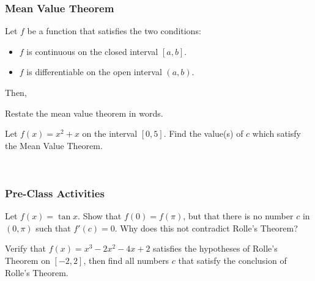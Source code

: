 \documentclass[notes]{subfiles}
\begin{document}
	\subsubsection*{Mean Value Theorem}
		\begin{thm}
			Let $f$ be a function that satisfies the two conditions:
			\begin{itemize}
				\item $f$ is continuous on the closed interval $[a,b]$.
				\item $f$ is differentiable on the open interval $(a,b)$.
			\end{itemize}
			Then, 
		\end{thm}
		
		\begin{ex}
			Restate the mean value theorem in words.
		\end{ex}
			\newpage
			
		\begin{pf}
		
		\end{pf}
			\newpage
		
		\begin{ex}
			Let $f(x) = x^2 + x$ on the interval $[0,5]$.  Find the value(s) of $c$ which satisfy the Mean Value Theorem.
		\end{ex}	
			\\
			
			\newsec $ $
			
	\subsubsection*{Pre-Class Activities}
		\begin{ex}
			Let $f(x) = \tan x$.  Show that $f(0) = f(\pi)$, but that there is no number $c$ in $(0,\pi)$ such that $f'(c) = 0$.  Why does this not contradict Rolle's Theorem?
		\end{ex}
			
		\begin{ex}
			Verify that $f(x) = x^3-2x^2-4x+2$ satisfies the hypotheses of Rolle's Theorem on $[-2,2]$, then find all numbers $c$ that satisfy the conclusion of Rolle's Theorem.
		\end{ex}
			
\end{document}
